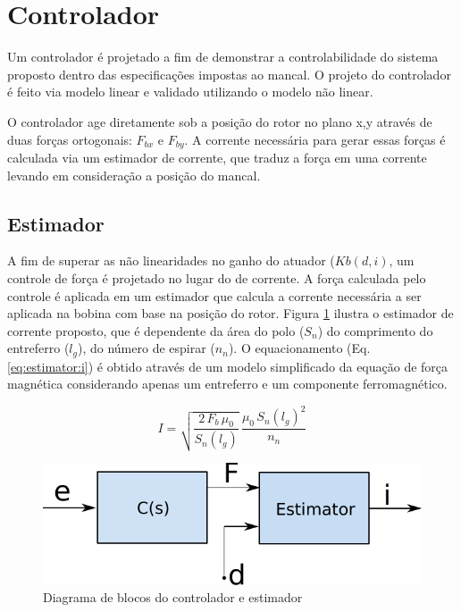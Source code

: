 \section{Controlador}

Um controlador é projetado a fim de demonstrar a controlabilidade do sistema proposto dentro das especificações impostas ao mancal. O projeto do controlador é feito via modelo linear e validado utilizando o modelo não linear. 

O controlador age diretamente sob a posição do rotor no plano x,y através de duas forças ortogonais: $F_{bx}$ e $F_{by}$. A corrente necessária para gerar essas forças é calculada via um estimador de corrente, que traduz a força em uma corrente levando em consideração a posição do mancal.

\subsection{Estimador}
	
A fim de superar as não linearidades no ganho do atuador ($Kb(d,i)$, um controle de força é projetado no lugar do de corrente. A força calculada pelo controle é aplicada em um estimador que calcula a corrente necessária a ser aplicada na bobina com base na posição do rotor. Figura \ref{fig:diagrama_controlador_estimador} ilustra o estimador de corrente proposto, que é dependente da área do polo ($S_n$) do comprimento do entreferro ($l_g$), do número de espirar ($n_n$). O equacionamento (Eq. \eqref{eq:estimator:i}) é obtido através de um modelo simplificado da equação de força magnética considerando apenas um entreferro e um componente ferromagnético.

	
\begin{equation}
I = \sqrt{\frac{2 \, F_b \, \mu_0}{S_n(l_g)}} \, \frac{\mu_0 \, S_n(l_g)^2}{n_n}
\label{eq:estimator:i}
\end{equation}
	
\begin{figure}[ht]
	\centering
	\includegraphics[width=0.4\linewidth]{Figs/Modelagem/controlador_estimador}
	\caption{Diagrama de blocos do controlador e estimador}
	\label{fig:diagrama_controlador_estimador}
\end{figure}

